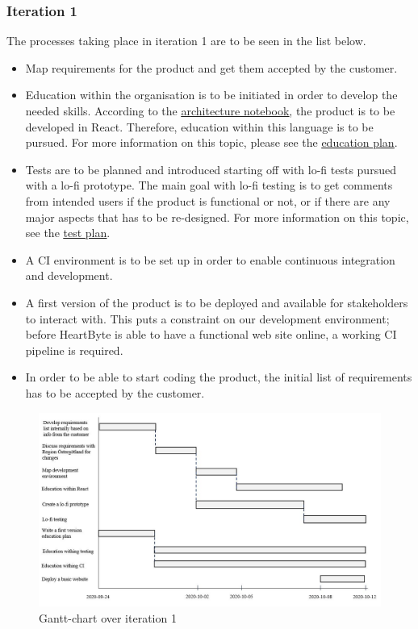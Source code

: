 \subsubsection{Iteration 1}
The processes taking place in iteration 1 are to be seen in the list below.
\begin{itemize}
    \item Map requirements for the product and get them accepted by the customer.
    \item Education within the organisation is to be initiated in order to develop the needed skills. According to the \href{https://gitlab.liu.se/tddc88-company-3-2020/deploy/-/tree/Document_branch/Architecture%20Notebook}{\underline{architecture notebook}}, the product is to be developed in React. Therefore, education within this language is to be pursued. For more information on this topic, please see the \href{https://gitlab.liu.se/tddc88-company-3-2020/deploy/-/tree/Document_branch/Education_plan}{\underline{education plan}}. 
    \item Tests are to be planned and introduced starting off with lo-fi tests pursued with a lo-fi prototype.  The main goal with lo-fi testing is to get comments from intended users if the product is functional or not, or if there are any major aspects that has to be re-designed. For more information on this topic, see the \href{https://gitlab.liu.se/tddc88-company-3-2020/deploy/-/tree/Document_branch/Test_Plan}{\underline{test plan}}. 
     \item A CI environment is to be set up in order to enable continuous integration and development.
    \item A first version of the product is to be deployed and available for stakeholders to interact with. This puts a constraint on our development environment; before HeartByte is able to have a functional web site online, a working CI pipeline is required. 
    \item In order to be able to start coding the product, the initial list of requirements has to be accepted by the customer.
\end{itemize}


\begin{figure}[H]
\centering
\includegraphics[width=\linewidth]{Pictures/iteration_1.JPG}
\caption{Gantt-chart over iteration 1}
\label{fig:iteration_1}
\end{figure}
 

